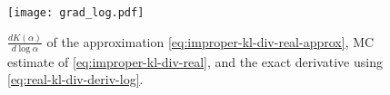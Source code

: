 \documentclass{article}
\begin{document}
\begin{figure}[!t]
  \centering
  \texttt{[image: grad\_log.pdf]}
  \caption{$\tfrac{d K(\alpha)}{d \log{\alpha}}$ of the approximation
  \eqref{eq:improper-kl-div-real-approx}, MC estimate of \eqref{eq:improper-kl-div-real},
  and the exact derivative using \eqref{eq:real-kl-div-deriv-log}.}
  \label{fig:molchanov-derivative-replica}
\end{figure}


\end{document}
